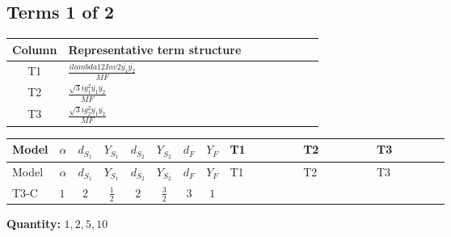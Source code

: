 \documentclass[8pt]{article}
\begin{document}
\begin{landscape}
\subsection*{Terms 1 of 2}
\begin{center}
\begin{tabular}{@{}c >{\raggedright\arraybackslash}p{0.82\linewidth}@{}}
\toprule
Column & Representative term structure \\
\midrule
T1 & \(\displaystyle \frac{i lambda12Inv2 \overline{y_{1}} \overline{y_{2}}}{MF}\) \\
\midrule
T2 & \(\displaystyle \frac{\sqrt{3} i g_{1}^{2} \overline{y_{1}} \overline{y_{2}}}{MF}\) \\
\midrule
T3 & \(\displaystyle \frac{\sqrt{3} i g_{2}^{2} \overline{y_{1}} \overline{y_{2}}}{MF}\) \\
\midrule
\bottomrule
\end{tabular}
\end{center}
\smallskip
\tiny
\begin{longtable}{@{}llcccccc >{\raggedright\arraybackslash}p{0.21\linewidth} >{\raggedright\arraybackslash}p{0.21\linewidth} >{\raggedright\arraybackslash}p{0.21\linewidth}@{}}
\toprule
Model & $\alpha$ & $d_{S_1}$ & $Y_{S_1}$ & $d_{S_2}$ & $Y_{S_2}$ & $d_F$ & $Y_F$ & T1 & T2 & T3 \\
\midrule
\endfirsthead
\toprule
Model & $\alpha$ & $d_{S_1}$ & $Y_{S_1}$ & $d_{S_2}$ & $Y_{S_2}$ & $d_F$ & $Y_F$ & T1 & T2 & T3 \\
\midrule
\endhead
T3-C & $1$ & $2$ & $\frac{1}{2}$ & $2$ & $\frac{3}{2}$ & $3$ & $1$ & \scriptsize\adjustbox{max width=\linewidth}{$\begin{gathered} - \frac{i lambda12Inv2 \overline{y_{1}} \overline{y_{2}}}{6 MF}\end{gathered}$} & \scriptsize\adjustbox{max width=\linewidth}{$\begin{gathered} - \frac{\sqrt{3} i g_{1}^{2} \overline{y_{1}} \overline{y_{2}}}{4 MF}\end{gathered}$} & \scriptsize\adjustbox{max width=\linewidth}{$\begin{gathered} - \frac{\sqrt{3} i g_{2}^{2} \overline{y_{1}} \overline{y_{2}}}{8 MF}\end{gathered}$} \\
\midrule
\bottomrule
\end{longtable}
\clearpage
\noindent\textbf{Quantity: }$\mathrm{1,2,5,10}$\par\smallskip

\end{landscape}
\end{document}
